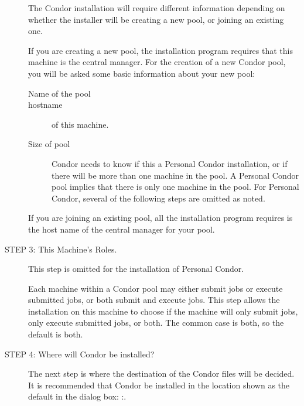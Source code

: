 \begin{description}
     The Condor installation will require different
     information depending on whether the installer will
	 be creating a new pool, or joining an existing one.

     If you are creating a new pool, the installation program
	 requires that this machine is the central manager.  
     For the creation of a new Condor pool, you will be asked
	 some basic information about your new pool:
     \begin{description}
     \item[Name of the pool]
     \item[hostname] of this machine.
     \item[Size of pool]
       Condor needs to know if this a Personal Condor installation,
       or if there will be more than one machine in the pool.
       A Personal Condor pool
       implies that there is only one machine in the pool.
       For Personal Condor, several of the following
       steps are omitted as noted.
     \end{description}

     If you are joining an existing pool, all the installation program
	 requires is the host name of the central manager for your pool.

\item[STEP 3: This Machine's Roles.] 

     This step is omitted for the installation of Personal Condor.

     Each machine within a Condor pool may either
     submit jobs or execute submitted jobs, or both
     submit and execute jobs.
     This step allows the installation on this machine
     to choose if the machine will only submit jobs,
     only execute submitted jobs, or both.
     The common case is both, so the default is both.

\item[STEP 4: Where will Condor be installed?]

The next step is where the destination of the Condor files will be
decided.
It is recommended that Condor be installed in the location shown as the default in the dialog box:
\verb@C:\Condor@.


\end{description}
